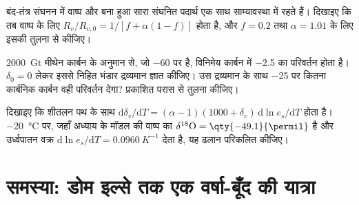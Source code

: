 \begin{exercise}[$\star\star\star$]\label{exo:b3:stable-isotopes:10}
बंद-तंत्र संघनन में वाष्प और बना हुआ सारा संघनित पदार्थ
एक साथ साम्यावस्था में रहते हैं। दिखाइए कि तब वाष्प के लिए $R_v/R_{v,0} = 1/[f +
\alpha(1 - f)]$ होता है, और $f = 0.2$ तथा
$\alpha = 1.01$ के लिए इसकी तुलना  से कीजिए।
\end{exercise}

\begin{exercise}[$\star\star\star$]\label{exo:b3:stable-isotopes:11}
\qty{2000}{Gt} मीथेन कार्बन के अनुमान से, जो \qty{-60}{\permil} पर है,
विनिमेय कार्बन में \qty{-2.5}{\permil} का परिवर्तन होता है।
$\delta_0 = 0$ लेकर इससे निहित भंडार द्रव्यमान ज्ञात कीजिए। उस द्रव्यमान के साथ
\qty{-25}{\permil} पर कितना कार्बनिक कार्बन वही परिवर्तन देगा?
प्रकाशित परास से तुलना कीजिए।
\end{exercise}

\begin{exercise}[$\star\star\star$]\label{exo:b3:stable-isotopes:12}
दिखाइए कि शीतलन पथ के साथ $\mathrm d\delta_v/\mathrm dT = (\alpha - 1)(1000 +
\delta_v)\,\mathrm d\ln e_s/\mathrm dT$ होता है। \qty{-20}{\celsius} पर, जहाँ अध्याय के मॉडल की
वाष्प का $\delta^{18}\mathrm O = \qty{-49.1}{\permil}$ है
और उर्ध्वपातन वक्र $\mathrm d\ln e_s/\mathrm dT =
\qty{0.0960}{K^{-1}}$ देता है, यह ढलान परिकलित कीजिए।
\end{exercise}

\section{समस्या: डोम इल्से तक एक वर्षा-बूँद की यात्रा}

